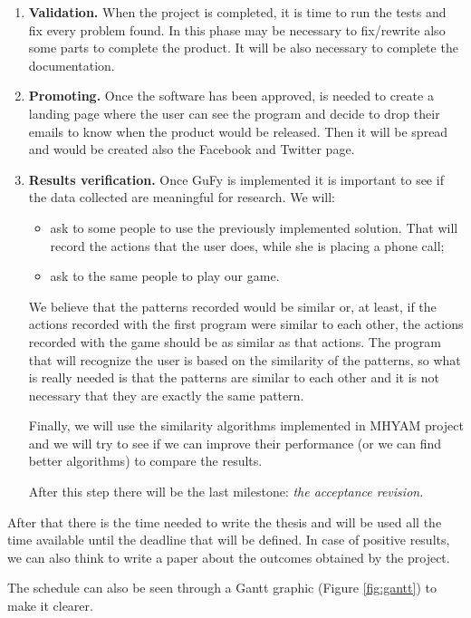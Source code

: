 \begin{enumerate}
\item \textbf{Validation.} When the project is completed, it is time to run the tests and fix every problem found. In this phase may be necessary to fix/rewrite also some parts to complete the product. It will be also necessary to complete the documentation.

\item \textbf{Promoting.} Once the software has been approved, is needed to create a landing page where the user can see the program and decide to drop their emails to know when the product would be released. Then it will be spread and would be created also the Facebook and Twitter page. 

\item \textbf{Results verification.} Once GuFy is implemented it is important to see if the data collected are meaningful for research. We will:
\begin{itemize}
\item ask to some people to use the previously implemented solution. That will record the actions that the user does, while she is placing a phone call;
\item ask to the same people to play our game.
\end{itemize}

We believe that the patterns recorded would be similar or, at least, if the actions recorded with the first program were similar to each other, the actions recorded with the game should be as similar as that actions. The program that will recognize the user is based on the similarity of the patterns, so what is really needed is that the patterns are similar to each other and it is not necessary that they are exactly the same pattern.

Finally, we will use the similarity algorithms implemented in MHYAM project and we will try to see if we can improve their performance (or we can find better algorithms) to compare the results.

After this step there will be the last milestone: \textit{the acceptance revision}.
\end{enumerate}

After that there is the time needed to write the thesis and will be used all the time available until the deadline that will be defined. In case of positive results, we can also think to write a paper about the outcomes obtained by the project.

The schedule can also be seen through a Gantt graphic (Figure \ref{fig:gantt}) to make it clearer.

